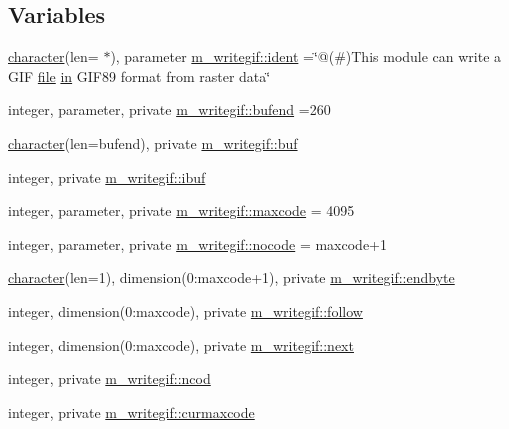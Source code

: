 \subsection*{Variables}
\begin{DoxyCompactItemize}
\item 
\hyperlink{option__stopwatch_83_8txt_abd4b21fbbd175834027b5224bfe97e66}{character}(len= $\ast$), parameter \hyperlink{namespacem__writegif_af1faf3b881fa6aee6d82b06da4dc3714}{m\+\_\+writegif\+::ident} =\char`\"{}@(\#)This module can write a G\+IF \hyperlink{what__overview_81_8txt_a447b56c526e8da30e0dc94673727ee25}{file} \hyperlink{M__journal_83_8txt_afce72651d1eed785a2132bee863b2f38}{in} G\+I\+F89 format from raster data\char`\"{}
\item 
integer, parameter, private \hyperlink{namespacem__writegif_accdaeeac4357a3dc3dead0ba36e7efd4}{m\+\_\+writegif\+::bufend} =260
\item 
\hyperlink{option__stopwatch_83_8txt_abd4b21fbbd175834027b5224bfe97e66}{character}(len=bufend), private \hyperlink{namespacem__writegif_aa50fc715675e43931ce58f557bf8eb02}{m\+\_\+writegif\+::buf}
\item 
integer, private \hyperlink{namespacem__writegif_a51ee343cdcbf2cd11f1b3740651077eb}{m\+\_\+writegif\+::ibuf}
\item 
integer, parameter, private \hyperlink{namespacem__writegif_ac55f9abf33971ad396b2ae59b288b0bb}{m\+\_\+writegif\+::maxcode} = 4095
\item 
integer, parameter, private \hyperlink{namespacem__writegif_a39141257b89b2cea89b4db4e0a372ffa}{m\+\_\+writegif\+::nocode} = maxcode+1
\item 
\hyperlink{option__stopwatch_83_8txt_abd4b21fbbd175834027b5224bfe97e66}{character}(len=1), dimension(0\+:maxcode+1), private \hyperlink{namespacem__writegif_a43cdcf79f632247eaebb73fc3a7ff25f}{m\+\_\+writegif\+::endbyte}
\item 
integer, dimension(0\+:maxcode), private \hyperlink{namespacem__writegif_aea2ce887598c0e5d80adb90558230c32}{m\+\_\+writegif\+::follow}
\item 
integer, dimension(0\+:maxcode), private \hyperlink{namespacem__writegif_a592346fdf478d7727c143cd25ece2a96}{m\+\_\+writegif\+::next}
\item 
integer, private \hyperlink{namespacem__writegif_aac26e9673fe5e79908a6ff576a298986}{m\+\_\+writegif\+::ncod}
\item 
integer, private \hyperlink{namespacem__writegif_a634657dd81148fd56f39232d7ceda8b5}{m\+\_\+writegif\+::curmaxcode}

\end{DoxyCompactItemize}
